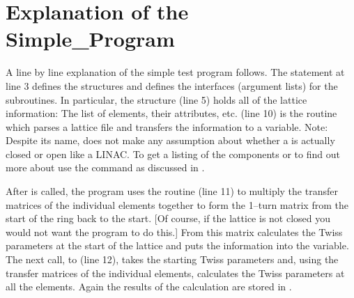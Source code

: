 \section{Explanation of the Simple\_Program}

A line by line explanation of the simple test program follows. 
The  statement at line 3
defines the \bmad structures and defines the interfaces
(argument lists) for the \bmad subroutines. In particular, the
 structure (line 5) holds all of the lattice
information: The list of elements, their attributes,
etc.  (line 10) is the routine which parses a lattice
file and transfers the information to a
 variable. Note: Despite its name, \bmad does
not make any assumption about whether a  is actually
closed or open like a LINAC. To get a listing of the 
components or to find out more about  use the 
command as discussed in .

After  is called, the program uses the
routine  (line 11) to multiply the transfer
matrices of the individual elements together to form the 1--turn
matrix from the start of the ring back to the start. [Of course,
if the lattice is not closed you would not want the program to do
this.] From this matrix
 calculates the Twiss parameters at the start of
the lattice and puts the information into the  variable. The
next call, to  (line 12), takes the starting
Twiss parameters and, using the transfer matrices of the individual
elements, calculates the Twiss parameters at all the elements. Again
the results of the calculation are stored in . 

